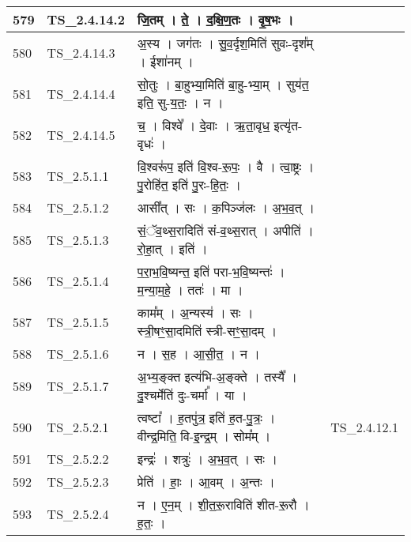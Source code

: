 \documentclass[17pt]{extarticle}
\begin{document}
\begin{longtable}{||p{0.4in}||p{0.9in}||p{4.0in}||p{0.9in}||}
        \hline
            579 & TS\_2.4.14.2 & जि॒तम्   ।   ते॒   ।   द॒क्षि॒ण॒तः   ।   वृ॒ष॒भः   ।    &      \\
        \hline
            580 & TS\_2.4.14.3 & अ॒स्य   ।   जग॑तः   ।   सु॒व॒र्दृश॒मिति॑ सुवः{-}दृश᳚म्   ।   ईशा॑नम्   ।    &      \\
        \hline
            581 & TS\_2.4.14.4 & सो॒तुः   ।   बा॒हुभ्या॒मिति॑ बा॒हु{-}भ्या॒म्   ।   सुय॑त॒ इति॒ सु{-}य॒तः॒   ।   न   ।    &      \\
        \hline
            582 & TS\_2.4.14.5 & च॒   ।   विश्वे᳚   ।   दे॒वाः   ।   ऋ॒ता॒वृध॒ इत्यृ॑त{-}वृधः॑   ।    &      \\
        \hline
            583 & TS\_2.5.1.1 & वि॒श्वरू॑प॒ इति॑ वि॒श्व{-}रू॒पः॒   ।   वै   ।   त्वा॒ष्ट्रः   ।   पु॒रोहि॑त॒ इति॑ पु॒रः{-}हि॒तः॒   ।    &      \\
        \hline
            584 & TS\_2.5.1.2 & आसी᳚त्   ।   सः   ।   क॒पिञ्ज॑लः   ।   अ॒भ॒व॒त्   ।    &      \\
        \hline
            585 & TS\_2.5.1.3 & सं॒ॅव॒थ्स॒रादिति॑ सं{-}व॒थ्स॒रात्   ।   अपीति॑   ।   रो॒हा॒त्   ।   इति॑   ।    &      \\
        \hline
            586 & TS\_2.5.1.4 & प॒रा॒भ॒वि॒ष्यन्त॒ इति॑ परा{-}भ॒वि॒ष्यन्तः॑   ।   म॒न्या॒म॒हे॒   ।   ततः॑   ।   मा   ।    &      \\
        \hline
            587 & TS\_2.5.1.5 & काम᳚म्   ।   अ॒न्यस्य॑   ।   सः   ।   स्त्री॒षꣳ॒॒सा॒दमिति॑ स्त्री{-}सꣳ॒॒सा॒दम्   ।    &      \\
        \hline
            588 & TS\_2.5.1.6 & न   ।   स॒ह   ।   आ॒सी॒त॒   ।   न   ।    &      \\
        \hline
            589 & TS\_2.5.1.7 & अ॒भ्य॒ङ्क्त इत्य॑भि{-}अ॒ङ्क्ते   ।   तस्यै᳚   ।   दु॒श्चर्मेति॑ दुः{-}चर्मा᳚   ।   या   ।    &      \\
        \hline
            590 & TS\_2.5.2.1 & त्वष्टा᳚   ।   ह॒तपु॑त्र॒ इति॑ ह॒त{-}पु॒त्रः॒   ।   वीन्द्र॒मिति॒ वि{-}इ॒न्द्र॒म्   ।   सोम᳚म्   ।    & TS\_2.4.12.1        \\
        \hline
            591 & TS\_2.5.2.2 & इन्द्रः॑   ।   शत्रुः॑   ।   अ॒भ॒व॒त्   ।   सः   ।    &      \\
        \hline
            592 & TS\_2.5.2.3 & प्रेति॑   ।   हाः॒   ।   आ॒वम्   ।   अ॒न्तः   ।    &      \\
        \hline
            593 & TS\_2.5.2.4 & न   ।   ए॒न॒म्   ।   शी॒त॒रू॒राविति॑ शीत{-}रू॒रौ   ।   ह॒तः॒   ।    &      \\
        \hline

\end{longtable}
\end{document}
